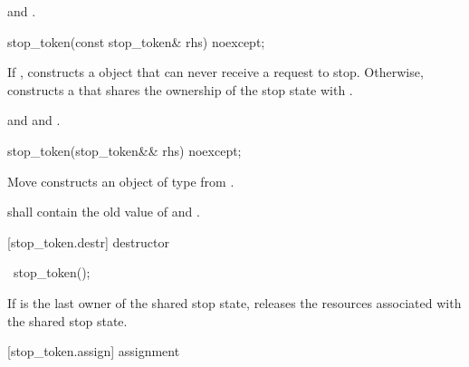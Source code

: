 {\begin{itemdescr}
  \pnum\postconditions {} and 
                       .
\end{itemdescr}


%
\begin{itemdecl}
stop_token(const stop_token& rhs) noexcept;
\end{itemdecl}
\begin{itemdescr}
  \pnum\effects If , constructs a  object
                that can never receive a request to stop.
                Otherwise, constructs a 
                that shares the ownership of the stop state with .

  \pnum\postconditions {}
                and 
                and .
\end{itemdescr}

%
\begin{itemdecl}
stop_token(stop_token&& rhs) noexcept;
\end{itemdecl}
\begin{itemdescr}
  \pnum\effects Move constructs an object of type  from .

  \pnum\postconditions {} shall contain the old value of  and
                        .
\end{itemdescr}

[stop_token.destr]{ destructor}

%
\begin{itemdecl}
~stop_token();
\end{itemdecl}

\begin{itemdescr}
 \pnum\effects If  is the last owner of the shared stop state,
                releases the resources associated with the shared stop state.
\end{itemdescr}

[stop_token.assign]{ assignment}

}

